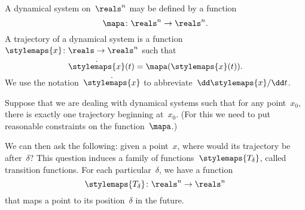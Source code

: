 \label{exa:transition-functions}
\begin{definition}
    \label{def:ct-dynsyst}
    A dynamical system on~$\reals^n$ may be defined by a function
    \begin{equation}
        \mapa \colon \reals^n \to \reals^n.
    \end{equation}
    A trajectory of a dynamical system is a function~$\stylemaps{x}\colon \reals \to \reals^n$ such that
    \begin{equation}
        \dot{\stylemaps{x}}(t) = \mapa(\stylemaps{x}(t)).
    \end{equation}
    We use the notation~$\dot{\stylemaps{x}}$ to abbreviate~$\dd \stylemaps{x} / \dd t$.
\end{definition}

Suppose that we are dealing with dynamical systems such that for any point~$x_0$, there is exactly one trajectory beginning at~$x_0$.
(For this we need to put reasonable constraints on the function~$\mapa$.)

We can then ask the following: given a point~$x$, where would its trajectory be after~$\delta$?
This question induces a family of functions~$\stylemaps{T_\delta}$, called transition functions.
For each particular~$\delta$, we have a function
\begin{equation*}
    \stylemaps{T_{\delta}}\colon \reals^n \to  \reals^n
\end{equation*}
that maps a point to its position~$\delta$ in the future.

